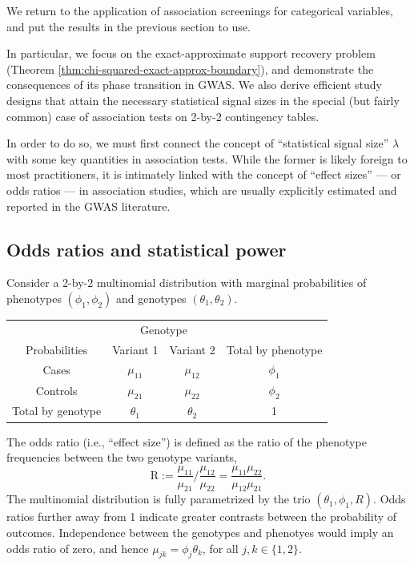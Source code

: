 

We return to the application of association screenings for categorical variables, and put the results in the previous section to use.

In particular, we focus on the exact-approximate support recovery problem (Theorem \ref{thm:chi-squared-exact-approx-boundary}), and demonstrate the consequences of its phase transition in GWAS.
We also derive efficient study designs that attain the necessary statistical signal sizes in the special (but fairly common) case of association tests on 2-by-2 contingency tables.

In order to do so, we must first connect the concept of ``statistical signal size'' $\lambda$ with some key quantities in association tests.
While the former is likely foreign to most practitioners, it is intimately linked with the concept of ``effect sizes'' --- or odds ratios --- in association studies, which are usually explicitly estimated and reported in the GWAS literature.

\subsection{Odds ratios and statistical power}
\label{subsec:odds-and-power}


Consider a 2-by-2 multinomial distribution with marginal probabilities of phenotypes $(\phi_1, \phi_2)$ and genotypes $(\theta_1, \theta_2)$.
\begin{center}
    \begin{tabular}{cccc}
    \hline
    & \multicolumn{2}{c}{Genotype} \\
    \cline{2-3}
    Probabilities & Variant 1 & Variant 2 & Total by phenotype \\
    \hline
    Cases & $\mu_{11}$ & $\mu_{12}$ & $\phi_1$ \\
    Controls & $\mu_{21}$ & $\mu_{22}$ & $\phi_2$ \\
    Total by genotype & $\theta_1$ & $\theta_2$ & 1 \\
    \hline
    \end{tabular}
\end{center}
The odds ratio (i.e., ``effect size'') is defined as the ratio of the phenotype frequencies between the two genotype variants,
\begin{equation} \label{eq:odds-ratio}
    \text{R} := \frac{\mu_{11}}{\mu_{21}}\Big/\frac{\mu_{12}}{\mu_{22}}
    = \frac{\mu_{11}\mu_{22}}{\mu_{12}\mu_{21}}.
\end{equation}
The multinomial distribution is fully parametrized by the trio $(\theta_1, \phi_1, R)$.
Odds ratios further away from 1 indicate greater contrasts between the probability of outcomes.
Independence between the genotypes and phenotyes would imply an odds ratio of zero, and hence $\mu_{jk} = \phi_j\theta_k$, for all $j,k \in\{1,2\}$.

